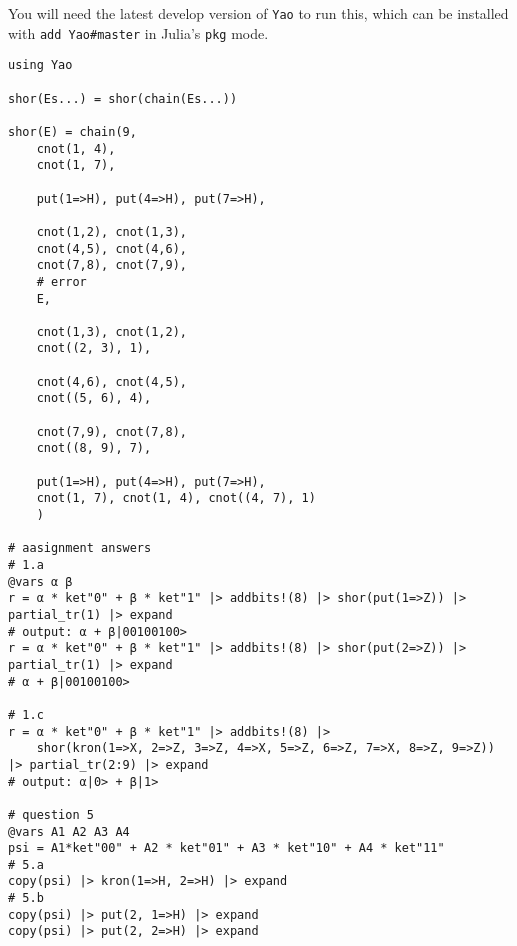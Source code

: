 \documentclass{article}
\begin{document}
\newpage
You will need the latest develop version of \texttt{Yao} to run this, which can be installed with \texttt{add Yao\#master}
in Julia's \texttt{pkg} mode.
\begin{lstlisting}
using Yao

shor(Es...) = shor(chain(Es...))

shor(E) = chain(9,
    cnot(1, 4),
    cnot(1, 7),

    put(1=>H), put(4=>H), put(7=>H),

    cnot(1,2), cnot(1,3),
    cnot(4,5), cnot(4,6),
    cnot(7,8), cnot(7,9),
    # error
    E,

    cnot(1,3), cnot(1,2),
    cnot((2, 3), 1),

    cnot(4,6), cnot(4,5),
    cnot((5, 6), 4),

    cnot(7,9), cnot(7,8),
    cnot((8, 9), 7),

    put(1=>H), put(4=>H), put(7=>H),
    cnot(1, 7), cnot(1, 4), cnot((4, 7), 1)
    )

# aasignment answers
# 1.a
@vars α β
r = α * ket"0" + β * ket"1" |> addbits!(8) |> shor(put(1=>Z)) |> partial_tr(1) |> expand
# output: α + β|00100100>
r = α * ket"0" + β * ket"1" |> addbits!(8) |> shor(put(2=>Z)) |> partial_tr(1) |> expand
# α + β|00100100>

# 1.c
r = α * ket"0" + β * ket"1" |> addbits!(8) |>
    shor(kron(1=>X, 2=>Z, 3=>Z, 4=>X, 5=>Z, 6=>Z, 7=>X, 8=>Z, 9=>Z)) |> partial_tr(2:9) |> expand
# output: α|0> + β|1>

# question 5
@vars A1 A2 A3 A4
psi = A1*ket"00" + A2 * ket"01" + A3 * ket"10" + A4 * ket"11"
# 5.a
copy(psi) |> kron(1=>H, 2=>H) |> expand
# 5.b
copy(psi) |> put(2, 1=>H) |> expand
copy(psi) |> put(2, 2=>H) |> expand
\end{lstlisting}
\end{document}
